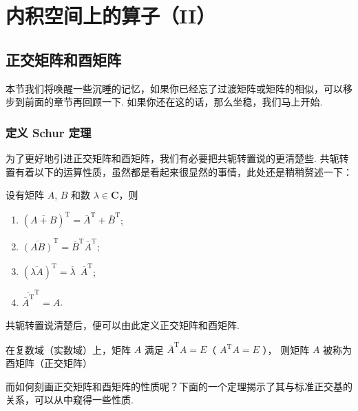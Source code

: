\chapter{内积空间上的算子（II）}

\section{正交矩阵和酉矩阵}

本节我们将唤醒一些沉睡的记忆，如果你已经忘了过渡矩阵或矩阵的相似，可以移步到前面的章节再回顾一下. 如果你还在这的话，那么坐稳，我们马上开始. 

\vspace{2ex}

\subsection{定义 \quad Schur 定理}

为了更好地引进正交矩阵和酉矩阵，我们有必要把共轭转置说的更清楚些. 
共轭转置有着以下的运算性质，虽然都是看起来很显然的事情，此处还是稍稍赘述一下：

设有矩阵 $ A $, $ B $ 和数 $ \lambda \in \mathbf{C}$，则

\begin{enumerate}    
    \item $ (\overline{A + B})^{\mathrm{T}} = \overline{A}^{\mathrm{T}} + \overline{B}^{\mathrm{T}} $;
    
    \item $ \overline{(AB)}^{\mathrm{T}} = \overline{B}^{\mathrm{T}} \overline{A}^{\mathrm{T}} $;
    
    \item $ (\overline{\lambda A})^{\mathrm{T}} = \overline{\lambda} \enspace \overline{A}^{\mathrm{T}} $;
    
    \item $ \overline{\overline{A}^{\mathrm{T}}}^{\mathrm{T}} = A $. 
\end{enumerate}

共轭转置说清楚后，便可以由此定义正交矩阵和酉矩阵. 

\begin{definition}   
    在复数域（实数域）上，矩阵 $ A $ 满足 $ \overline{A}^{\mathrm{T}} A = E $（ $ {A}^{\mathrm{T}} A = E $ ），
    则矩阵 $ A $ 被称为酉矩阵（正交矩阵） 
\end{definition}

而如何刻画正交矩阵和酉矩阵的性质呢？下面的一个定理揭示了其与标准正交基的关系，可以从中窥得一些性质.  

